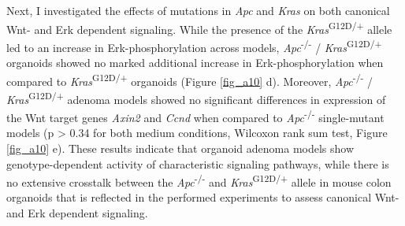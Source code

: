 \begin{flushleft}
\bigbreak
Next, I investigated the effects of mutations in \textit{Apc} and \textit{Kras} on both canonical Wnt- and Erk dependent signaling. While the presence of the \textit{Kras}\textsuperscript{G12D/+} allele led to an increase in Erk-phosphorylation across models, \textit{Apc}\textsuperscript{-/-} / \textit{Kras}\textsuperscript{G12D/+} organoids showed no marked additional increase in Erk-phosphorylation when compared to \textit{Kras}\textsuperscript{G12D/+} organoids (Figure \ref{fig_a10} d). Moreover, \textit{Apc}\textsuperscript{-/-} / \textit{Kras}\textsuperscript{G12D/+} adenoma models showed no significant differences in expression of the Wnt target genes \textit{Axin2} and \textit{Ccnd} when compared to \textit{Apc}\textsuperscript{-/-}  single-mutant models  (p > 0.34 for both medium conditions, Wilcoxon rank sum test, Figure \ref{fig_a10} e). These results indicate that organoid adenoma models show genotype-dependent activity of characteristic signaling pathways, while there is no extensive crosstalk between the \textit{Apc}\textsuperscript{-/-} and \textit{Kras}\textsuperscript{G12D/+} allele in mouse colon organoids that is reflected in the performed experiments to assess canonical Wnt- and Erk dependent signaling.  

\clearpage

\end{flushleft}
